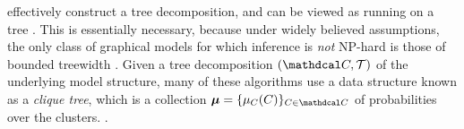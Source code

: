 effectively construct a tree decomposition, and can be
viewed as running on a tree \parencite[\S9-11]{koller2009probabilistic}.
This is essentially necessary, because under widely believed assumptions,
the only class of graphical models
for which inference is \emph{not} NP-hard is
those of bounded treewidth 
\parencite{chandrasekaran2012complexity}.
%
Given a tree decomposition $(\C, \mathcal T)$ of the underlying model structure,
many of these algorithms
use a 
data structure
known as a \emph{clique tree}, which
%
is a collection
$\bmu = \{\mu_C(C)\}_{ C \in \C}$ 
of probabilities over the clusters.
\parencite[see][\S10]{koller2009probabilistic}.

